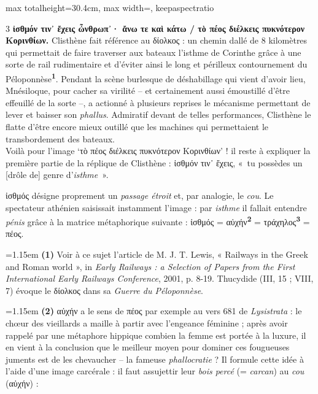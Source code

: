 \documentclass[11pt,twoside]{book}
\newcommand{\italique}[1]{\textit{#1}}
\newcommand{\grec}[1]{{\policeGr #1}}
\newcommand{\marqueur}[1]{\textsuperscript{\color{rubricRed}\textbf{#1}}}
\begin{document}
\begin{adjustbox}{max totalheight=30.4cm, max width=\textwidth, keepaspectratio}
\begin{minipage}{\textwidth}
{\begin{multicols}{3}
 \textbf{ἰσθμόν τιν᾽ ἔχεις ὦνθρωπ᾽· ἄνω τε καὶ κάτω / τὸ πέος διέλκεις πυκνότερον Κορινθίων.} Clisthène fait référence au \grec{δίολκος} : un chemin dallé de 8 kilomètres qui permettait de faire traverser aux bateaux l'isthme de Corinthe grâce à une sorte de rail rudimentaire et d'éviter ainsi le long et périlleux contournement du Péloponnèse\marqueur{1}. Pendant la scène burlesque de déshabillage qui vient d'avoir lieu, Mnésiloque, pour cacher sa virilité – et certainement aussi émoustillé d'être effeuillé de la sorte –, a actionné à plusieurs reprises le mécanisme permettant de lever et baisser son \italique{phallus}. Admiratif devant de telles performances, Clisthène le flatte d'être encore mieux outillé que les machines qui permettaient le transbordement des bateaux.\\ Voilà pour l'image `τὸ πέος διέλκεις πυκνότερον Κορινθίων' ! il reste à expliquer la première partie de la réplique de Clisthène : ἰσθμόν τιν᾽ ἔχεις, «~tu possèdes un [drôle de] genre d'\italique{isthme}~».
\par\vspace{1.5pt}
\noindent ἰσθμός désigne proprement un \italique{passage étroit} et, par analogie, le \italique{cou}. Le spectateur athénien saisissait instamment l'image : par \italique{isthme} il fallait entendre \italique{pénis} grâce à la matrice métaphorique suivante : ἰσθμός = αὐχήν\marqueur{2} = τράχηλος\marqueur{3} = πέος.
\par\vspace{1.5pt}
\par\vspace{1.2pt}\par\nopagebreak\vspace{1pt}\noindent\hangindent=1.15em {\color{sepiaNote}\textbf{(1)}} Voir à ce sujet l'article de M. J. T. Lewis, « Railways in the Greek and Roman world », in \italique{Early Railways : a Selection of Papers from the First International Early Railways Conference}, 2001, p. 8-19. Thucydide (III, 15 ; VIII, 7) évoque le δίολκος dans sa \italique{Guerre du Péloponnèse}.
\par\vspace{1.5pt}
\noindent\hangindent=1.15em {\color{sepiaNote}\textbf{(2)}} αὐχήν a le sens de πέος par exemple au vers 681 de \italique{Lysistrata} : le chœur des vieillards a maille à partir avec l'engeance féminine ; après avoir rappelé par une métaphore hippique combien la femme est portée à la luxure, il en vient à la conclusion que le meilleur moyen pour dominer ces fougueuses juments est de les chevaucher -- la fameuse \italique{phallocratie} ? Il formule cette idée à l'aide d'une image carcérale : il faut assujettir leur \italique{bois percé} (= \italique{carcan}) au \italique{cou} (αὐχήν) :

\end{multicols}}
\end{minipage}
\end{adjustbox}
\end{document}
